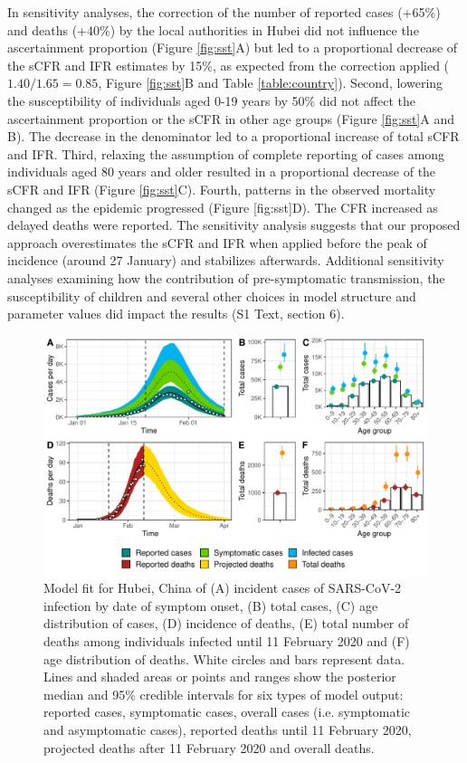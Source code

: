 \documentclass{article}
\begin{document}
In sensitivity analyses, the correction of the number of reported cases (+65\%) and deaths (+40\%) by the local authorities in Hubei did not influence the ascertainment proportion (Figure \ref{fig:sst}A) but led to a proportional decrease of the sCFR and IFR estimates by 15\%, as expected from the correction applied ($1.40/1.65=0.85$, Figure \ref{fig:sst}B and Table \ref{table:country}).
Second, lowering the susceptibility of individuals aged 0-19 years by 50\% did not affect the ascertainment proportion or the sCFR in other age groups (Figure \ref{fig:sst}A and B). 
The decrease in the denominator led to a proportional increase of total sCFR and IFR.
Third, relaxing the assumption of complete reporting of cases among individuals aged 80 years and older resulted in a proportional decrease of the sCFR and IFR (Figure \ref{fig:sst}C).
Fourth, patterns in the observed mortality changed as the epidemic progressed (Figure [fig:sst]D). 
The CFR increased as delayed deaths were reported. 
The sensitivity analysis suggests that our proposed approach overestimates the sCFR and IFR when applied before the peak of incidence (around 27 January) and stabilizes afterwards. 
Additional sensitivity analyses examining how the contribution of pre-symptomatic transmission, the susceptibility of children and several other choices in model structure and parameter values did impact the results (S1 Text, section 6).


\begin{figure}[h]
	\includegraphics[width=\linewidth]{../format_output/figures_v3/fig2.pdf}
	\caption{Model fit for Hubei, China of (A) incident cases of SARS-CoV-2 infection by date of symptom onset, (B) total cases, (C) age distribution of cases, (D) incidence of deaths, (E) total number of deaths among individuals infected until 11 February 2020 and (F) age distribution of deaths. White circles and bars represent data. Lines and shaded areas or points and ranges show the posterior median and 95\% credible intervals for six types of model output: reported cases, symptomatic cases, overall cases (i.e. symptomatic and asymptomatic cases), reported deaths until 11 February 2020, projected deaths after 11 February 2020 and overall deaths.}
	\label{fig:fit}
\end{figure}
\end{document}
